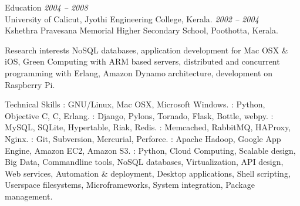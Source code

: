 \documentclass{resume}
\author{Sreejith Kesavan}
\begin{document}
\maketitle


\begin{category}{Education}
   \hfill {\em 2004 -- 2008}\\
  University of Calicut, Jyothi Engineering College, Kerala.
   \hfill {\em 2002 -- 2004}\\
  Kshethra Pravesana Memorial Higher Secondary School, Poothotta, Kerala.
\end{category}


\begin{category}{Research interests}
  \citemnobullet NoSQL databases, application development for Mac OSX \& iOS, Green Computing with 
  ARM based servers, distributed and concurrent programming with Erlang, Amazon Dynamo architecture, 
  development on Raspberry Pi.
\end{category}

\begin{category}{Technical Skills}
  : GNU/Linux, Mac OSX, Microsoft Windows.
  : Python, Objective C, C, Erlang.
  : Django, Pylons, Tornado, Flask, Bottle, webpy.
  : MySQL, SQLite, Hypertable, Riak, Redis.
  : Memcached, RabbitMQ, HAProxy, Nginx.
  : Git, Subversion, Mercurial, Perforce.
  : Apache Hadoop, Google App Engine, Amazon EC2, Amazon S3.
  : Python, Cloud Computing, Scalable design, Big Data, Commandline 
  tools, NoSQL databases, Virtualization, API design, Web services, Automation \& deployment, 
  Desktop applications, Shell scripting, Userspace filesystems, Microframeworks, System integration, 
  Package management.
\end{category}

\end{document}
